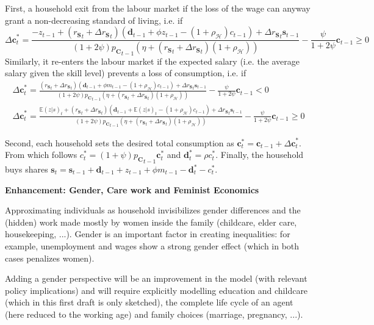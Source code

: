 \documentclass[a4paper, headings=standardclasses]{scrartcl}
\newenvironment{enh}[1][]{\begin{framed}\noindent\textbf{Enhancement: #1}\par}{\end{framed}}
\begin{document}
First, a household exit from the labour market if the loss of the wage can anyway grant a non-decreasing standard of living, i.e. if
$$ {\Delta \mathbf{c}}^*_t = \frac{-z_{t-1} + ({r_\mathbf{S}}_t + {\Delta r_\mathbf{S}}_{t})(\mathbf{d}_{t-1} + \phi z_{t-1} - (1+\rho_{\mathcal{H}}) c_{t-1}) + {\Delta r_\mathbf{S}}_{t} \mathbf{s}_{t-1}}{(1+2\psi){p_\mathbf{C}}_{t-1}(\eta +  ({r_\mathbf{S}}_t + {\Delta r_\mathbf{S}}_{t})(1+\rho_{\mathcal{H}}))} - \frac{\psi}{1+2\psi}{\mathbf{c}_{t-1}} \ge 0$$
Similarly, it re-enters the labour market if the expected salary (i.e. the average salary given the skill level) prevents a loss of consumption, i.e. if
\begin{multline*}
	{\Delta \mathbf{c}}^*_t = \frac{({r_\mathbf{S}}_t + {\Delta r_\mathbf{S}}_{t})(\mathbf{d}_{t-1} + \phi m_{t-1} - (1+\rho_{\mathcal{H}}) c_{t-1}) + {\Delta r_\mathbf{S}}_{t} \mathbf{s}_{t-1}}{(1+2\psi){p_\mathbf{C}}_{t-1}(\eta +  ({r_\mathbf{S}}_t + {\Delta r_\mathbf{S}}_{t})(1+\rho_{\mathcal{H}}))} - \frac{\psi}{1+2\psi}{\mathbf{c}_{t-1}} < 0 \\
	{\Delta \mathbf{c}}^*_t = \frac{{\mathbb{E}(z|s)}_{t} + ({r_\mathbf{S}}_t + {\Delta r_\mathbf{S}}_{t})(\mathbf{d}_{t-1} + {\mathbb{E}(z|s)}_{t} - (1+\rho_{\mathcal{H}}) c_{t-1}) + {\Delta r_\mathbf{S}}_{t} \mathbf{s}_{t-1}}{(1+2\psi){p_\mathbf{C}}_{t-1}(\eta +  ({r_\mathbf{S}}_t + {\Delta r_\mathbf{S}}_{t})(1+\rho_{\mathcal{H}}))} - \frac{\psi}{1+2\psi}{\mathbf{c}_{t-1}} \ge 0
\end{multline*}

Second, each household sets the desired total consumption as $\mathbf{c}^*_t = \mathbf{c}_{t-1} + {\Delta \mathbf{c}}^*_t$. From which follows $c^*_t = (1+\psi) {p_\mathbf{C}}_{t-1} \mathbf{c}^*_t$ and $\mathbf{d}^*_t = \rho c^*_t$. Finally, the household buys shares $\mathbf{s}_t = \mathbf{s}_{t-1} + \mathbf{d}_{t-1} + z_{t-1} + \phi m_{t-1} - \mathbf{d}^*_t - c^*_t$.

\begin{enh}[Gender, Care work and Feminist Economics]
	Approximating individuals as household invisibilizes gender differences and the (hidden) work made mostly by women inside the family (childcare, elder care, housekeeping, ...).
	Gender is an important factor in creating inequalities: for example, unemployment and wages show a strong gender effect (which in both cases penalizes women).

	Adding a gender perspective will be an improvement in the model (with relevant policy implications) and will require explicitly modelling education and childcare (which in this first draft is only sketched), the complete life cycle of an agent (here reduced to the working age) and family choices (marriage, pregnancy, ...).
\end{enh}
\end{document}
